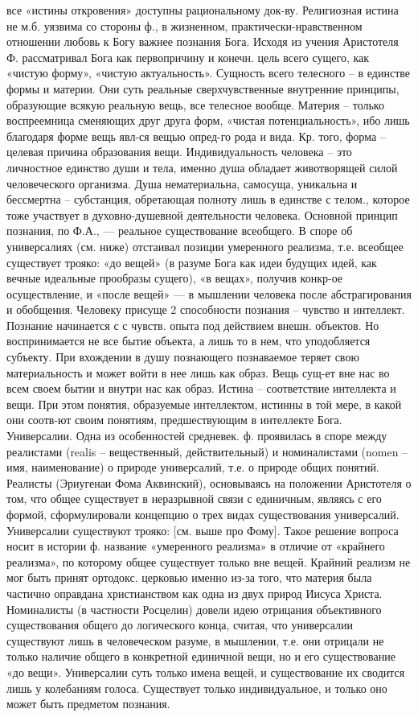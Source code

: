 \documentclass[12pt]{article}
\begin{document}
все «истины откровения» доступны рациональному док-ву. Религиозная истина не м.б. уязвима со стороны ф., в
жизненном, практически-нравственном отношении любовь к Богу важнее познания Бога.
Исходя из учения Аристотеля Ф. рассматривал Бога как первопричину и конечн. цель всего сущего, как «чистую
форму», «чистую актуальность». Сущность всего телесного – в единстве формы и материи. Они суть реальные
сверхчувственные внутренние принципы, образующие всякую реальную вещь, все телесное вообще. Материя –
только воспреемница сменяющих друг друга форм, «чистая потенциальность», ибо лишь благодаря форме вещь
явл-ся вещью опред-го рода и вида. Кр. того, форма – целевая причина образования вещи.
Индивидуальность человека – это личностное единство души и тела, именно душа обладает животворящей
силой  человеческого  организма.  Душа  нематериальна,  самосуща,  уникальна  и  бессмертна  –  субстанция,
обретающая полноту лишь в единстве с телом., которое  тоже участвует в духовно-душевной деятельности
человека.
Основной принцип познания, по Ф.А., — реальное существование всеобщего. В споре об универсалиях (см.
ниже) отстаивал позиции умеренного реализма, т.е. всеобщее существует трояко: «до вещей» (в разуме Бога как
идеи будущих идей, как вечные идеальные прообразы сущего), «в вещах», получив конкр-ое осуществление, и
«после вещей» — в мышлении человека после абстрагирования и обобщения. Человеку присуще 2 способности
познания – чувство и интеллект. Познание начинается с с чувств. опыта под действием внешн. объектов. Но
воспринимается не все бытие объекта, а лишь то в нем, что уподобляется субъекту. При вхождении в душу
познающего познаваемое теряет свою материальность и может войти в нее лишь как образ. Вещь сущ-ет вне
нас во всем своем бытии и внутри нас как образ.
Истина – соответствие интеллекта и вещи. При этом понятия, образуемые интеллектом, истинны в той мере, в
какой они соотв-ют своим понятиям, предшествующим в интеллекте Бога.
Универсалии.  Одна  из  особенностей  средневек.  ф.  проявилась  в  споре  между  реалистами  (realis  –
вещественный, действительный) и номиналистами (nomen – имя, наименование) о природе универсалий, т.е. о
природе общих понятий. Реалисты (Эриугенаи Фома Аквинский), основываясь на положении Аристотеля о том,
что общее существует в неразрывной связи с единичным, являясь с его формой, сформулировали концепцию о
трех видах существования универсалий. Универсалии существуют трояко: [см. выше про Фому]. Такое решение 
вопроса носит в истории ф. название «умеренного реализма» в отличие от «крайнего реализма», по которому
общее существует только вне вещей. Крайний реализм не мог быть принят ортодокс. церковью именно из-за
того, что материя была частично оправдана христианством как одна из двух природ Иисуса Христа.
Номиналисты  (в  частности  Росцелин)  довели  идею  отрицания  объективного  существования  общего  до
логического конца, считая, что универсалии существуют лишь в человеческом разуме, в мышлении, т.е. они
отрицали  не  только  наличие  общего  в  конкретной  единичной  вещи,  но  и  его  существование  «до  вещи».
Универсалии суть только имена вещей, и существование их сводится лишь у колебаниям голоса. Существует
только индивидуальное, и только оно может быть предметом познания.
\end{document}
